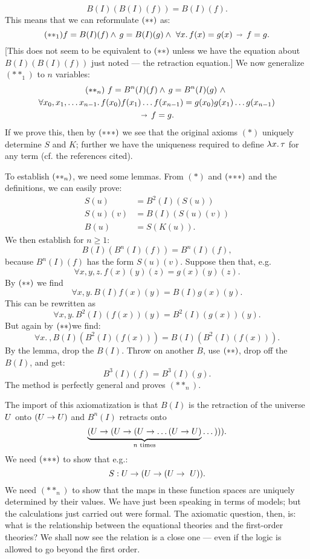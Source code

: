 $$
B(I)(B(I)(f)) = B(I)(f).
$$
This means that we can reformulate $\ss$ as:
$$
(**_1) f = B(I)(f) \land\, g = B(I)(g) \land\,\, \forall x.\,f(x) = g(x) \, \imp\, f = g.
$$
[This does not seem to be equivalent to $\ss$ unless we have the equation about
$B(I)(B(I)(f))$ just noted --- the retraction equation.] We now generalize $(**_1)$ to $n$
variables:
\begin{multline*}
\ssn \,\,
f = B^n(I)(f) \land\, g = B^n(I)(g) \,\,\land\,\, \\
\forall x_0, x_1, \dots x_{n-1}.\,f(x_0)f(x_1)\dots f(x_{n-1}) = g(x_0)g(x_1)\dots g(x_{n-1})\\
 \, \imp\, f = g.
\end{multline*}
If we prove this, then by $\sss$ we see that the original axioms $(*)$ uniquely determine
$S$ and $K$; further we have the uniqueness required to define $\lm{x}.\tau$ for any term
(cf. the references cited).

To establish $\ssn$, we need some lemmas.  From $(*)$ and $\sss$ and the definitions, we
can easily prove:
\begin{align*}
S(u) &= B^2(I)(S(u))\\
S(u)(v) &= B(I)(S(u)(v))\\
B(u) &= S(K(u)).
\end{align*}
%
We then establish for $n\geq 1$:
$$
B(I)(B^n(I)(f)) = B^n(I)(f),
$$
because $B^n(I)(f)$ has the form $S(u)(v)$. Suppose then that, e.g.
$$
\forall x, y, z .\, f(x)(y)(z) = g(x)(y)(z).
$$
By $\ss$ we find
$$
\forall x, y. \, B(I)f(x)(y) = B(I)g(x)(y).
$$
This can be rewritten as
$$
\forall x,y. \, B^2(I)(f(x))(y) = B^2(I)(g(x))(y).
$$
But again by $\ss$we find:
$$
\forall x.\ , B(I)(B^2(I)(f(x)))=B(I)(B^2(I)(f(x))).
$$
By the lemma, drop the $B(I)$. Throw on another $B$, use $\ss$, drop off the $B(I)$, and
get:
$$
B^3(I)(f) = B^3(I)(g).
$$
The method is perfectly general and proves $(**_n)$.

The import of this axiomatization is that $B(I)$ is the retraction of the universe $\U$
onto $(\U \to \U)$ and $B^n (I)$ retracts onto
$$
\underbrace{(\U \to (\U \to (\U \to \dots (\U \to \U)}_{n {\textrm{ times}}} \dots ))).
$$
We need $\sss$ to show that e.g.:
$$
S: \U \to (\U \to (\U \to\ U)).
$$
We need $(**_n)$ to show that the maps in these function spaces are uniquely determined by
their values. We have just been speaking in terms of models; but the calculations just
carried out were formal. The axiomatic question, then, is: what is the relationship
between the equational theories and the first-order theories? We shall now see the
relation is a close one --- even if the logic is allowed to go beyond the first order.


